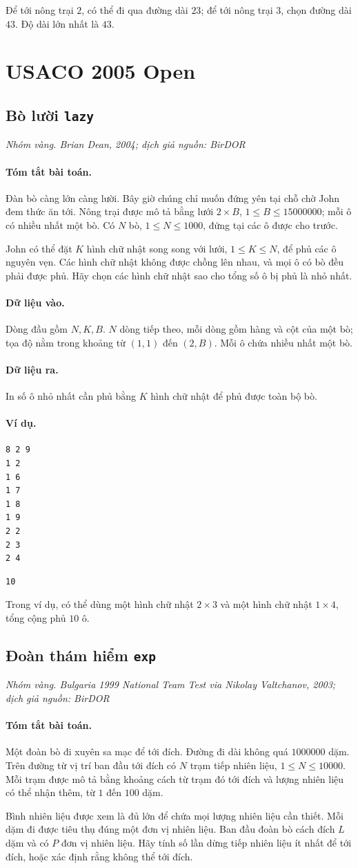 \documentclass[11pt]{article}
\newcommand{\problem}[4]{%
  \subsection[#1 (#2)]{#1 \hfill {\normalsize\texttt{#2}}}%
  \noindent\textit{#3. #4}\par\smallskip
}
\newcommand{\iosec}[1]{\paragraph{#1}}
\begin{document}
Để tới nông trại \(2\), có thể đi qua đường dài \(23\); để tới nông trại
\(3\), chọn đường dài \(43\). Độ dài lớn nhất là \(43\).

\section{USACO 2005 Open}

\problem{Bò lười}{lazy}{Nhóm vàng}{Brian Dean, 2004; dịch giả nguồn: BirDOR}

\iosec{Tóm tắt bài toán.}
Đàn bò càng lớn càng lười. Bây giờ chúng chỉ muốn đứng yên tại chỗ chờ John
đem thức ăn tới. Nông trại được mô tả bằng lưới \(2\times B\),
\(1\le B\le 15000000\); mỗi ô có nhiều nhất một bò. Có \(N\) bò,
\(1\le N\le 1000\), đứng tại các ô được cho trước.

John có thể đặt \(K\) hình chữ nhật song song với lưới, \(1\le K\le N\), để
phủ các ô nguyên vẹn. Các hình chữ nhật không được chồng lên nhau, và mọi ô
có bò đều phải được phủ. Hãy chọn các hình chữ nhật sao cho tổng số ô bị phủ
là nhỏ nhất.

\iosec{Dữ liệu vào.}
Dòng đầu gồm \(N,K,B\). \(N\) dòng tiếp theo, mỗi dòng gồm hàng và cột của
một bò; tọa độ nằm trong khoảng từ \((1,1)\) đến \((2,B)\). Mỗi ô chứa nhiều
nhất một bò.

\iosec{Dữ liệu ra.}
In số ô nhỏ nhất cần phủ bằng \(K\) hình chữ nhật để phủ được toàn bộ bò.

\iosec{Ví dụ.}
\begin{verbatim}
8 2 9
1 2
1 6
1 7
1 8
1 9
2 2
2 3
2 4
\end{verbatim}

\begin{verbatim}
10
\end{verbatim}

Trong ví dụ, có thể dùng một hình chữ nhật \(2\times 3\) và một hình chữ nhật
\(1\times 4\), tổng cộng phủ \(10\) ô.

\problem{Đoàn thám hiểm}{exp}{Nhóm vàng}{Bulgaria 1999 National Team Test via Nikolay Valtchanov, 2003; dịch giả nguồn: BirDOR}

\iosec{Tóm tắt bài toán.}
Một đoàn bò đi xuyên sa mạc để tới đích. Đường đi dài không quá \(1000000\)
dặm. Trên đường từ vị trí ban đầu tới đích có \(N\) trạm tiếp nhiên liệu,
\(1\le N\le 10000\). Mỗi trạm được mô tả bằng khoảng cách từ trạm đó tới đích
và lượng nhiên liệu có thể nhận thêm, từ \(1\) đến \(100\) dặm.

Bình nhiên liệu được xem là đủ lớn để chứa mọi lượng nhiên liệu cần thiết.
Mỗi dặm đi được tiêu thụ đúng một đơn vị nhiên liệu. Ban đầu đoàn bò cách
đích \(L\) dặm và có \(P\) đơn vị nhiên liệu. Hãy tính số lần dừng tiếp
nhiên liệu ít nhất để tới đích, hoặc xác định rằng không thể tới đích.
\end{document}
